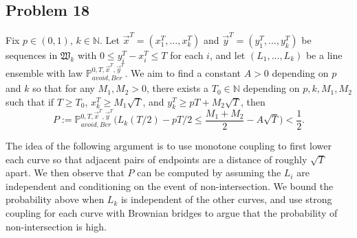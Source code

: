 \documentclass[12pt]{article}
\begin{document}
\subsection*{Problem 18}

	Fix $p\in(0,1)$, $k\in\mathbb{N}$. Let $\vec{x}^T = (x_1^T,\dots,x_k^T)$ and $\vec{y}^T = (y_1^T,\dots,y_k^T)$ be sequences in $\mathfrak{W}_k$ with $0\leq y_i^T - x_i^T \leq T$ for each $i$, and let $(L_1,\dots,L_k)$ be a line ensemble with law $\mathbb{P}^{0,T,\vec{x}^T,\vec{y}^T}_{avoid, Ber}$.  We aim to find a constant $A>0$ depending on $p$ and $k$ so that for any $M_1, M_2 > 0$, there exists a $T_0 \in \mathbb{N}$ depending on $p,k,M_1,M_2$ such that if $T\geq T_0$, $x_k^T \geq M_1\sqrt{T}$, and $y_k^T \geq pT + M_2\sqrt{T}$, then
	\[
	P := \mathbb{P}^{0,T,\vec{x}^T,\vec{y}^T}_{avoid, Ber} \Big( L_k(T/2) - pT/2 \leq \frac{M_1+M_2}{2} - A\sqrt{T} \Big) < \frac{1}{2}.
	\]
	
	The idea of the following argument is to use monotone coupling to first lower each curve so that adjacent pairs of endpoints are a distance of roughly $\sqrt{T}$ apart. We then observe that $P$ can be computed by assuming the $L_i$ are independent and conditioning on the event of non-intersection. We bound the probability above when $L_k$ is independent of the other curves, and use strong coupling for each curve with Brownian bridges to argue that the probability of non-intersection is high.
	
\end{document}
